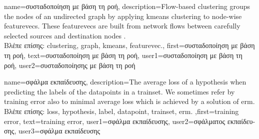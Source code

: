 {name={\foreignlanguage{greek}{συσταδοποίηση με βάση τη ροή}},
	description={Flow-based \gls{clustering} groups the nodes 
		of an undirected \gls{graph} by applying \gls{kmeans} \gls{clustering} to node-wise 
		\gls{featurevec}s. These \gls{featurevec}s are built from network flows between 
		carefully selected sources and destination nodes \cite{FlowSpecClustering2021}.\\
		\foreignlanguage{greek}{Βλέπε επίσης:} \gls{clustering}, \gls{graph}, \gls{kmeans}, \gls{featurevec}.}, 
	first={\foreignlanguage{greek}{συσταδοποίηση με βάση τη ροή}},
	text={\foreignlanguage{greek}{συσταδοποίηση με βάση τη ροή}},
	user1={\foreignlanguage{greek}{συσταδοποίηση με βάση τη ροή}}, %
    	user2={\foreignlanguage{greek}{συσταδοποίησης με βάση τη ροή}} %
}

{name={\foreignlanguage{greek}{σφάλμα εκπαίδευσης}},
	description={The average \gls{loss} of a \gls{hypothesis} when 
		predicting the \gls{label}s of the \gls{datapoint}s in a \gls{trainset}. 
		We sometimes refer by training error also to minimal average \gls{loss} 
		which is achieved by a solution of \gls{erm}.\\
		\foreignlanguage{greek}{Βλέπε επίσης:} \gls{loss}, \gls{hypothesis}, \gls{label}, \gls{datapoint}, \gls{trainset}, \gls{erm}.
		},first={training error},
		text={training error},
		user1={\foreignlanguage{greek}{σφάλμα εκπαίδευσης}}, %
  		user2={\foreignlanguage{greek}{σφάλματος εκπαίδευσης}}, %
		user3={\foreignlanguage{greek}{σφάλμα εκπαίδευσης}} %
}

